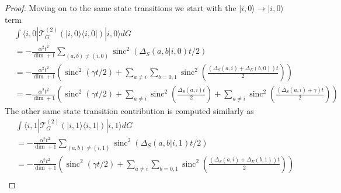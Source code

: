 \documentclass{article}
\newcommand{\ket}[1]{|#1\rangle}
\newcommand{\bra}[1]{\langle #1|}
\newcommand{\ketbra}[2]{| #1\rangle\! \langle #2|}
\newcommand{\parens}[1]{\left( #1 \right)}
\DeclareMathOperator{\sinc}{sinc}
\begin{document}
\begin{proof}
    Moving on to the same state transitions we start with the $\ket{i, 0} \to \ket{i, 0}$ term
    \begin{align}
        &\int \bra{i,0} \mathcal{T}^{(2)}_G (\ketbra{i, 0}{i, 0}) \ket{i,0} dG \nonumber \\
        &= -\frac{\alpha^2 t^2}{\dim + 1} \sum_{(a,b) \neq (i, 0)} \sinc^2 \parens{\Delta_S(a, b | i, 0) t / 2} \\ 
        &= - \frac{\alpha^2 t^2}{\dim  + 1} \parens{\sinc^2 (\gamma t / 2) + \sum_{a \neq i} \sum_{b = 0, 1} \sinc^2\parens{\frac{(\Delta_S(a, i) + \Delta_E(b, 0))t}{2}} } \\
        &=- \frac{\alpha^2 t^2}{\dim  + 1} \parens{\sinc^2 (\gamma t / 2) + \sum_{a \neq i} \sinc^2 \left( \frac{\Delta_S(a, i) t}{2} \right) + \sum_{a \neq i} \sinc^2\parens{\frac{(\Delta_S(a, i) +\gamma)t}{2}} }
    \end{align}
    The other same state transition contribution is computed similarly as
        \begin{align}
        &\int \bra{i,1} \mathcal{T}^{(2)}_G (\ketbra{i, 1}{i, 1}) \ket{i,1} dG \nonumber \\
        &= -\frac{\alpha^2 t^2}{\dim + 1} \sum_{(a,b) \neq (i, 1)} \sinc^2 \parens{\Delta_S(a, b | i, 1) t / 2} \\ 
        &= - \frac{\alpha^2 t^2}{\dim  + 1} \parens{\sinc^2 (\gamma t / 2) + \sum_{a \neq i} \sum_{b = 0, 1} \sinc^2\parens{\frac{(\Delta_S(a, i) + \Delta_E(b, 1))t}{2}} } \\

\end{align}
\end{proof}
\end{document}
